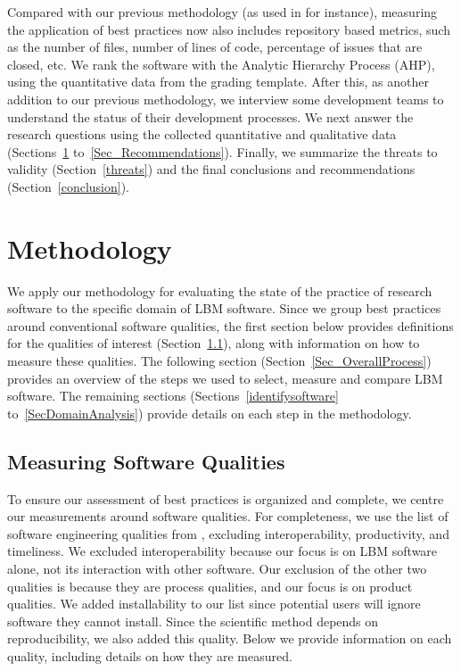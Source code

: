 \documentclass[final, 3p, times, authoryear]{elsarticle}
\begin{document}
Compared with our previous methodology (as used in \citet{SmithEtAl2016} for
instance), measuring the application of best practices now also includes
repository based metrics, such as the number of files, number of lines of code,
percentage of issues that are closed, etc.  We rank the software with the
Analytic Hierarchy Process (AHP), using the quantitative data from the grading
template. After this, as another addition to our previous methodology, we
interview some development teams to understand the status of their
development processes. We next answer the research questions using the collected
quantitative and qualitative data (Sections~\ref{methodology}
to~\ref{Sec_Recommendations}).  Finally, we summarize the threats to validity
(Section~\ref{threats}) and the final conclusions and recommendations
(Section~\ref{conclusion}).

\section{Methodology} \label{methodology}

We apply our methodology for evaluating the state of the practice of research
software \citep{SmithEtAl2021, SmithAndMichalski2022} to the specific domain of
LBM software.  Since we group best practices around conventional software
qualities, the first section below provides definitions for the qualities of
interest (Section~\ref{softwarequalities}), along with information on how to
measure these qualities. The following section
(Section~\ref{Sec_OverallProcess}) provides an overview of the steps we used to
select, measure and compare LBM software.  The remaining sections
(Sections~\ref{identifysoftware} to~\ref{SecDomainAnalysis}) provide details on
each step in the methodology. 

\subsection{Measuring Software Qualities} \label{softwarequalities}

To ensure our assessment of best practices is organized and complete, we centre
our measurements around software qualities. For completeness, we use the list of
software engineering qualities from \citet[p.\ 17--33]{GhezziEtAl2003},
excluding interoperability, productivity, and timeliness. We excluded
interoperability because our focus is on LBM software alone, not its interaction
with other software. Our exclusion of the other two qualities is because they
are process qualities, and our focus is on product qualities. We added
installability to our list since potential users will ignore software they
cannot install.  Since the scientific method depends on reproducibility, we also
added this quality. Below we provide information on each quality, including
details on how they are measured. 
\end{document}
